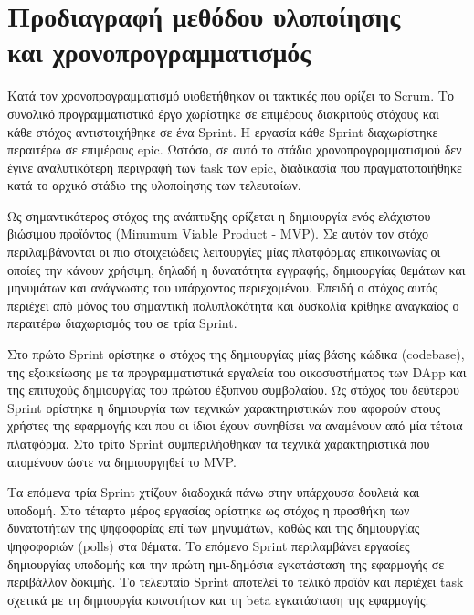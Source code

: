 \newpage
\setcounter{section}{8}
\setcounter{section}{7}
\section[Προδιαγραφή μεθόδου υλοποίησης και χρονοπρογραμματισμός]{Προδιαγραφή μεθόδου υλοποίησης \\και χρονοπρογραμματισμός}
\label{section:3-8-implementation-methodology-specification}

Κατά τον χρονοπρογραμματισμό υιοθετήθηκαν οι τακτικές που ορίζει το Scrum. Το συνολικό προγραμματιστικό έργο χωρίστηκε σε επιμέρους διακριτούς στόχους και κάθε στόχος αντιστοιχήθηκε σε ένα Sprint. Η εργασία κάθε Sprint διαχωρίστηκε περαιτέρω σε επιμέρους epic. Ωστόσο, σε αυτό το στάδιο χρονοπρογραμματισμού δεν έγινε αναλυτικότερη περιγραφή των task των epic, διαδικασία που πραγματοποιήθηκε κατά το αρχικό στάδιο της υλοποίησης των τελευταίων.

Ως σημαντικότερος στόχος της ανάπτυξης ορίζεται η δημιουργία ενός ελάχιστου βιώσιμου προϊόντος (Minumum Viable Product - MVP). Σε αυτόν τον στόχο περιλαμβάνονται οι πιο στοιχειώδεις λειτουργίες μίας πλατφόρμας επικοινωνίας οι οποίες την κάνουν χρήσιμη, δηλαδή η δυνατότητα εγγραφής, δημιουργίας θεμάτων και μηνυμάτων και ανάγνωσης του υπάρχοντος περιεχομένου. Επειδή ο στόχος αυτός περιέχει από μόνος του σημαντική πολυπλοκότητα και δυσκολία κρίθηκε αναγκαίος ο περαιτέρω διαχωρισμός του σε τρία Sprint.

Στο πρώτο Sprint ορίστηκε ο στόχος της δημιουργίας μίας βάσης κώδικα (codebase), της εξοικείωσης με τα προγραμματιστικά εργαλεία του οικοσυστήματος των DApp και της επιτυχούς δημιουργίας του πρώτου έξυπνου συμβολαίου. Ως στόχος του δεύτερου Sprint ορίστηκε η δημιουργία των τεχνικών χαρακτηριστικών που αφορούν στους χρήστες της εφαρμογής και που οι ίδιοι έχουν συνηθίσει να αναμένουν από μία τέτοια πλατφόρμα. Στο τρίτο Sprint συμπεριλήφθηκαν τα τεχνικά χαρακτηριστικά που απομένουν ώστε να δημιουργηθεί το MVP.

Τα επόμενα τρία Sprint χτίζουν διαδοχικά πάνω στην υπάρχουσα δουλειά και υποδομή. Στο τέταρτο μέρος εργασίας ορίστηκε ως στόχος η προσθήκη των δυνατοτήτων της ψηφοφορίας επί των μηνυμάτων, καθώς και της δημιουργίας ψηφοφοριών (polls) στα θέματα. Το επόμενο Sprint περιλαμβάνει εργασίες δημιουργίας υποδομής και την πρώτη ημι-δημόσια εγκατάσταση της εφαρμογής σε περιβάλλον δοκιμής. Το τελευταίο Sprint αποτελεί το τελικό προϊόν και περιέχει task σχετικά με τη δημιουργία κοινοτήτων και τη beta εγκατάσταση της εφαρμογής.

